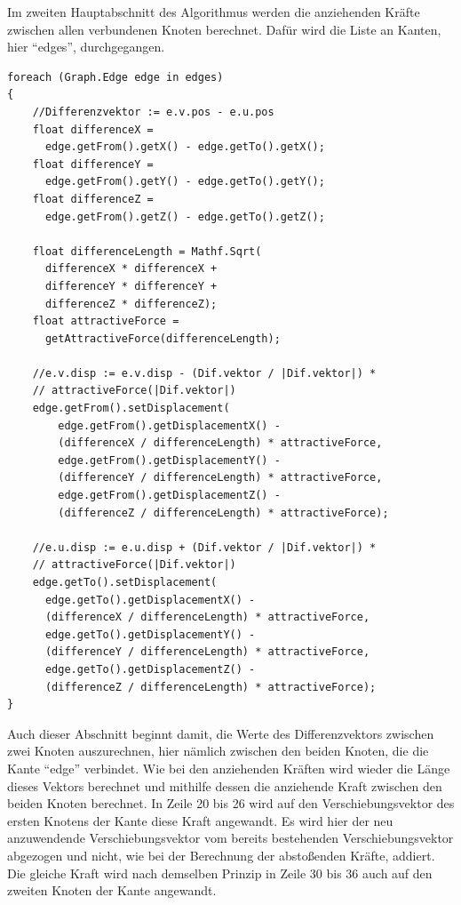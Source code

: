 \documentclass[12pt, a4paper]{article}
\begin{document}
Im zweiten Hauptabschnitt des Algorithmus werden die anziehenden Kräfte zwischen allen verbundenen Knoten berechnet. Dafür wird die Liste an Kanten, hier "`edges"', durchgegangen.
\begin{lstlisting}
foreach (Graph.Edge edge in edges)
{
	//Differenzvektor := e.v.pos - e.u.pos
	float differenceX =
      edge.getFrom().getX() - edge.getTo().getX();
	float differenceY =
      edge.getFrom().getY() - edge.getTo().getY();
	float differenceZ =
      edge.getFrom().getZ() - edge.getTo().getZ();

	float differenceLength = Mathf.Sqrt(
      differenceX * differenceX +
      differenceY * differenceY +
      differenceZ * differenceZ);
	float attractiveForce =
      getAttractiveForce(differenceLength);

	//e.v.disp := e.v.disp - (Dif.vektor / |Dif.vektor|) *
    // attractiveForce(|Dif.vektor|)
	edge.getFrom().setDisplacement(
    	edge.getFrom().getDisplacementX() -
        (differenceX / differenceLength) * attractiveForce, 
        edge.getFrom().getDisplacementY() -
        (differenceY / differenceLength) * attractiveForce, 
        edge.getFrom().getDisplacementZ() -
        (differenceZ / differenceLength) * attractiveForce);

	//e.u.disp := e.u.disp + (Dif.vektor / |Dif.vektor|) *
    // attractiveForce(|Dif.vektor|)
	edge.getTo().setDisplacement(
      edge.getTo().getDisplacementX() -
      (differenceX / differenceLength) * attractiveForce,
      edge.getTo().getDisplacementY() -
      (differenceY / differenceLength) * attractiveForce,
      edge.getTo().getDisplacementZ() -
      (differenceZ / differenceLength) * attractiveForce);
}
\end{lstlisting}
Auch dieser Abschnitt beginnt damit, die Werte des Differenzvektors zwischen zwei Knoten auszurechnen, hier nämlich zwischen den beiden Knoten, die die Kante "`edge"' verbindet. Wie bei den anziehenden Kräften wird wieder die Länge dieses Vektors berechnet und mithilfe dessen die anziehende Kraft zwischen den beiden Knoten berechnet. In Zeile 20 bis 26 wird auf den Verschiebungsvektor des ersten Knotens der Kante diese Kraft angewandt. Es wird hier der neu anzuwendende Verschiebungsvektor vom bereits bestehenden Verschiebungsvektor abgezogen und nicht, wie bei der Berechnung der abstoßenden Kräfte, addiert. Die gleiche Kraft wird nach demselben Prinzip in Zeile 30 bis 36 auch auf den zweiten Knoten der Kante angewandt.\\

\newpage
\end{document}
